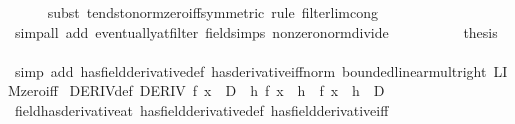 \begin{isabellebody}
\ \ \ \ \isamarkupfalse%
\ {\isacharparenleft}{\kern0pt}subst\ tendsto{\isacharunderscore}{\kern0pt}norm{\isacharunderscore}{\kern0pt}zero{\isacharunderscore}{\kern0pt}iff{\isacharbrackleft}{\kern0pt}symmetric{\isacharbrackright}{\kern0pt}{\isacharcomma}{\kern0pt}\ rule\ filterlim{\isacharunderscore}{\kern0pt}cong{\isacharparenright}{\kern0pt}\isanewline
\ \ \ \ \ \ \isamarkupfalse%
\ {\isacharparenleft}{\kern0pt}simp{\isacharunderscore}{\kern0pt}all\ add{\isacharcolon}{\kern0pt}\ eventually{\isacharunderscore}{\kern0pt}at{\isacharunderscore}{\kern0pt}filter\ field{\isacharunderscore}{\kern0pt}simps\ nonzero{\isacharunderscore}{\kern0pt}norm{\isacharunderscore}{\kern0pt}divide{\isacharparenright}{\kern0pt}\isanewline
\ \ \ \ \isamarkupfalse%
\isanewline
\ \ \isamarkupfalse%
\ \isamarkupfalse%
\ {\isacharquery}{\kern0pt}thesis\isanewline
\ \ \ \ \isamarkupfalse%
\ {\isacharparenleft}{\kern0pt}simp\ add{\isacharcolon}{\kern0pt}\ has{\isacharunderscore}{\kern0pt}field{\isacharunderscore}{\kern0pt}derivative{\isacharunderscore}{\kern0pt}def\ has{\isacharunderscore}{\kern0pt}derivative{\isacharunderscore}{\kern0pt}iff{\isacharunderscore}{\kern0pt}norm\ bounded{\isacharunderscore}{\kern0pt}linear{\isacharunderscore}{\kern0pt}mult{\isacharunderscore}{\kern0pt}right\ LIM{\isacharunderscore}{\kern0pt}zero{\isacharunderscore}{\kern0pt}iff{\isacharparenright}{\kern0pt}\isanewline
{}\isamarkupfalse%
%
\endisatagproof
{\isafoldproof}%
%
\isadelimproof
\isanewline
%
\endisadelimproof
\isanewline
{}\isamarkupfalse%
\ DERIV{\isacharunderscore}{\kern0pt}def{\isacharcolon}{\kern0pt}\ {\isachardoublequoteopen}DERIV\ f\ x\ {\isacharcolon}{\kern0pt}{\isachargreater}{\kern0pt}\ D\ {\isasymlongleftrightarrow}\ {\isacharparenleft}{\kern0pt}{\isasymlambda}h{\isachardot}{\kern0pt}\ {\isacharparenleft}{\kern0pt}f\ {\isacharparenleft}{\kern0pt}x\ {\isacharplus}{\kern0pt}\ h{\isacharparenright}{\kern0pt}\ {\isacharminus}{\kern0pt}\ f\ x{\isacharparenright}{\kern0pt}\ {\isacharslash}{\kern0pt}\ h{\isacharparenright}{\kern0pt}\ {\isasymmidarrow}{}{\isasymrightarrow}\ D{\isachardoublequoteclose}\isanewline
%
\isadelimproof
\ \ %
\endisadelimproof
%
\isatagproof
{}\isamarkupfalse%
\ field{\isacharunderscore}{\kern0pt}has{\isacharunderscore}{\kern0pt}derivative{\isacharunderscore}{\kern0pt}at\ has{\isacharunderscore}{\kern0pt}field{\isacharunderscore}{\kern0pt}derivative{\isacharunderscore}{\kern0pt}def\ has{\isacharunderscore}{\kern0pt}field{\isacharunderscore}{\kern0pt}derivative{\isacharunderscore}{\kern0pt}iff\ \isacommand{{\isachardot}{\kern0pt}{\isachardot}{\kern0pt}}\isamarkupfalse%

\end{isabellebody}
